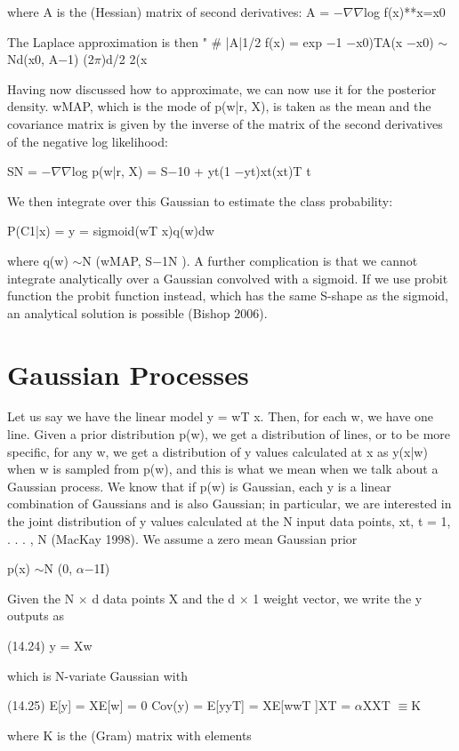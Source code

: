 where A is the (Hessian) matrix of second derivatives: A = $-$$\nabla$$\nabla$log f(x)**x=x0

The Laplace approximation is then " \# |A|1/2 f(x) = exp $-$1 $-$x0)TA(x $-$x0) $\sim$Nd(x0, A$-$1) (2$\pi$)d/2 2(x

Having now discussed how to approximate, we can now use it for the posterior density. wMAP, which is the mode of p(w|r, X), is taken as the mean and the covariance matrix is given by the inverse of the matrix of the second derivatives of the negative log likelihood:

SN = $-$$\nabla$$\nabla$log p(w|r, X) = S$-$10 + yt(1 $-$yt)xt(xt)T t

We then integrate over this Gaussian to estimate the class probability:

P(C1|x) = y = sigmoid(wT x)q(w)dw

where q(w) $\sim$N (wMAP, S$-$1N ). A further complication is that we cannot integrate analytically over a Gaussian convolved with a sigmoid. If we use probit function the probit function instead, which has the same S-shape as the sigmoid, an analytical solution is possible (Bishop 2006).

\section{Gaussian Processes}

Let us say we have the linear model y = wT x. Then, for each w, we have one line. Given a prior distribution p(w), we get a distribution of lines, or to be more specific, for any w, we get a distribution of y values calculated at x as y(x|w) when w is sampled from p(w), and this is what we mean when we talk about a Gaussian process. We know that if p(w) is Gaussian, each y is a linear combination of Gaussians and is also Gaussian; in particular, we are interested in the joint distribution of y values calculated at the N input data points, xt, t = 1, . . . , N (MacKay 1998). We assume a zero mean Gaussian prior

p(x) $\sim$N (0, $\alpha$$-$1I)

Given the N $\times$ d data points X and the d $\times$ 1 weight vector, we write the y outputs as

(14.24) y = Xw

which is N-variate Gaussian with

(14.25) E[y] = XE[w] = 0 Cov(y) = E[yyT] = XE[wwT ]XT = $\alpha$XXT $\equiv$K

where K is the (Gram) matrix with elements

